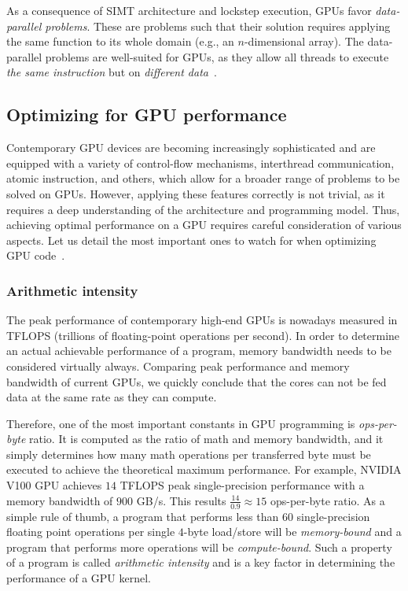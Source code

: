 As a consequence of SIMT architecture and lockstep execution, GPUs favor \emph{data-parallel problems}. These are problems such that their solution requires applying the same function to its whole domain (e.g., an $n$-dimensional array). The data-parallel problems are well-suited for GPUs, as they allow all threads to execute \emph{the same instruction} but on \emph{different data}~\cite{navarro2014survey}.

\subsection{Optimizing for GPU performance}
\label{sec:gpu_optim}

Contemporary GPU devices are becoming increasingly sophisticated and are equipped with a variety of control-flow mechanisms, interthread communication, atomic instruction, and others, which allow for a broader range of problems to be solved on GPUs. However, applying these features correctly is not trivial, as it requires a deep understanding of the architecture and programming model. Thus, achieving optimal performance on a GPU requires careful consideration of various aspects. Let us detail the most important ones to watch for when optimizing GPU code~\cite{pratx2011gpu}.

\subsubsection{Arithmetic intensity}
\label{sec:arithmetic_int}

The peak performance of contemporary high-end GPUs is nowadays measured in TFLOPS (trillions of floating-point operations per second). In order to determine an actual achievable performance of a program, memory bandwidth needs to be considered virtually always. Comparing peak performance and memory bandwidth of current GPUs, we quickly conclude that the cores can not be fed data at the same rate as they can compute.

Therefore, one of the most important constants in GPU programming is \emph{ops-per-byte} ratio. It is computed as the ratio of math and memory bandwidth, and it simply determines how many math operations per transferred byte must be executed to achieve the theoretical maximum performance. For example, NVIDIA V100 GPU achieves $14$ TFLOPS peak single-precision performance with a memory bandwidth of $900$ GB/s. This results $\frac{14}{0.9} \approx 15$ ops-per-byte ratio. As a simple rule of thumb, a program that performs less than $60$ single-precision floating point operations per single $4$-byte load/store will be \emph{memory-bound} and a program that performs more operations will be \emph{compute-bound}. Such a property of a program is called \emph{arithmetic intensity} and is a key factor in determining the performance of a GPU kernel.

